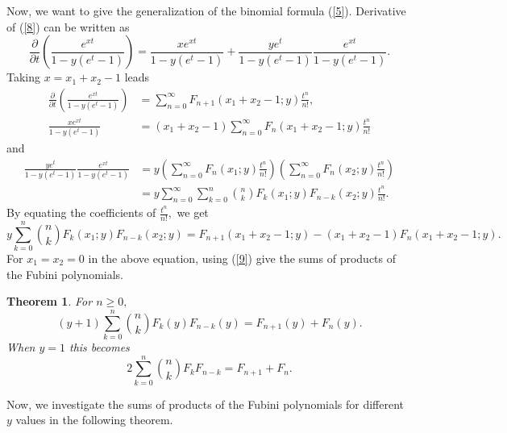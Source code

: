 \documentclass{article}%
\newtheorem{theorem}{Theorem}
\begin{document}
Now, we want to give the generalization of the binomial formula (\ref{5}).
Derivative of (\ref{8}) can be written as%
\[
\frac{\partial}{\partial t}\left(  \frac{e^{xt}}{1-y\left(  e^{t}-1\right)
}\right)  =\frac{xe^{xt}}{1-y\left(  e^{t}-1\right)  }+\frac{ye^{t}%
}{1-y\left(  e^{t}-1\right)  }\frac{e^{xt}}{1-y\left(  e^{t}-1\right)  }.
\]
Taking $x=x_{1}+x_{2}-1$ leads%
\begin{align*}
\frac{\partial}{\partial t}\left(  \frac{e^{xt}}{1-y\left(  e^{t}-1\right)
}\right)   &  =\sum_{n=0}^{\infty}F_{n+1}\left(  x_{1}+x_{2}-1;y\right)
\frac{t^{n}}{n!},\\
\frac{xe^{xt}}{1-y\left(  e^{t}-1\right)  }  &  =\left(  x_{1}+x_{2}-1\right)
\sum_{n=0}^{\infty}F_{n}\left(  x_{1}+x_{2}-1;y\right)  \frac{t^{n}}{n!}%
\end{align*}
and
\begin{align*}
\frac{ye^{t}}{1-y\left(  e^{t}-1\right)  }\frac{e^{xt}}{1-y\left(
e^{t}-1\right)  }  &  =y\left(  \sum_{n=0}^{\infty}F_{n}\left(  x_{1}%
;y\right)  \frac{t^{n}}{n!}\right)  \left(  \sum_{n=0}^{\infty}F_{n}\left(
x_{2};y\right)  \frac{t^{n}}{n!}\right) \\
&  =y\sum_{n=0}^{\infty}\sum_{k=0}^{n}\binom{n}{k}F_{k}\left(  x_{1};y\right)
F_{n-k}\left(  x_{2};y\right)  \frac{t^{n}}{n!}.
\end{align*}
By equating the coefficients of $\frac{t^{n}}{n!},$ we get
\[
y\sum_{k=0}^{n}\binom{n}{k}F_{k}\left(  x_{1};y\right)  F_{n-k}\left(
x_{2};y\right)  =F_{n+1}\left(  x_{1}+x_{2}-1;y\right)  -\left(  x_{1}%
+x_{2}-1\right)  F_{n}\left(  x_{1}+x_{2}-1;y\right)  .
\]
For $x_{1}=x_{2}=0$ in the above equation, using (\ref{9}) give the sums of
products of the Fubini polynomials.

\begin{theorem}
\label{teo1}For $n\geq0,$%
\begin{equation}
\left(  y+1\right)  \sum_{k=0}^{n}\binom{n}{k}F_{k}\left(  y\right)
F_{n-k}\left(  y\right)  =F_{n+1}\left(  y\right)  +F_{n}\left(  y\right)  .
\label{13}%
\end{equation}
When $y=1$ this becomes
\begin{equation}
2\sum_{k=0}^{n}\binom{n}{k}F_{k}F_{n-k}=F_{n+1}+F_{n}. \label{12}%
\end{equation}

\end{theorem}

Now, we investigate the sums of products of the Fubini polynomials for
different $y$ values in the following theorem.
\end{document}
